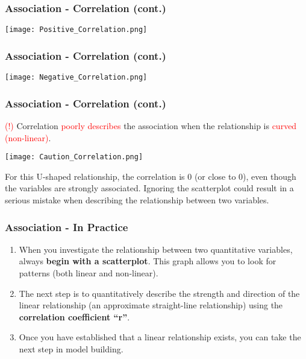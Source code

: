 \documentclass[11pt, xcolor=x11names,compress]{beamer}
\begin{document}
\begin{frame}[fragile,t]
\frametitle{Association - Correlation (cont.)}
\begin{center}
    \texttt{[image: Positive\_Correlation.png]}
\end{center}
\end{frame}

\begin{frame}[fragile,t]
\frametitle{Association - Correlation (cont.)}
\begin{center}
    \texttt{[image: Negative\_Correlation.png]}
\end{center}
\end{frame}

\begin{frame}[fragile,t]
\frametitle{Association - Correlation (cont.)}
\textcolor{red}{(!)} Correlation \textcolor{red}{poorly describes} the association when the relationship is \textcolor{red}{curved (non-linear)}. 
\begin{center}
    \texttt{[image: Caution\_Correlation.png]}
\end{center}
For this U-shaped relationship, the correlation is 0 (or close to 0), even though the variables are strongly associated. Ignoring the scatterplot could result in a serious mistake when describing the relationship between two variables.
\end{frame}

\begin{frame}[fragile,t]
\frametitle{Association - In Practice}
\begin{enumerate}
    \item When you investigate the relationship between two quantitative variables, always \textbf{begin with a scatterplot}. This graph allows you to look for patterns (both linear and non-linear). 
    \vspace{3mm}
    \item The next step is to quantitatively describe the strength and direction of the linear relationship (an approximate straight-line relationship) using  the \textbf{correlation coefficient “r”}. 
    \vspace{3mm}
    \item Once you have established that a linear relationship exists, you can take the next step in model building.
\end{enumerate}
\end{frame}
\end{document}
